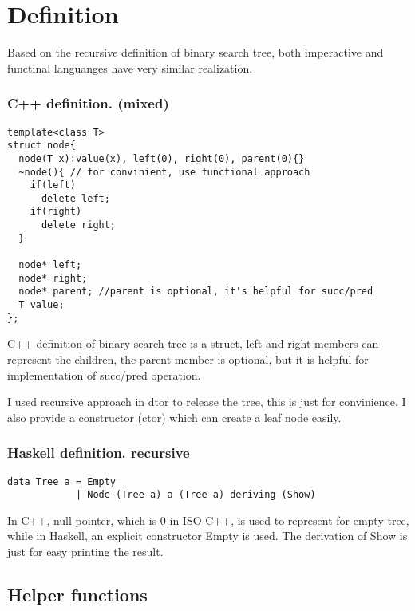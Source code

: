 \documentclass{article}
\begin{document}
\section{Definition}
\label{definition}

Based on the recursive definition of binary search tree, both imperactive and functinal 
languanges have very similar realization.

\subsubsection*{C++ definition. (mixed)}
\lstset{language=C++}
\begin{lstlisting}
template<class T>
struct node{
  node(T x):value(x), left(0), right(0), parent(0){}
  ~node(){ // for convinient, use functional approach
    if(left)
      delete left;
    if(right)
      delete right;
  }

  node* left; 
  node* right;
  node* parent; //parent is optional, it's helpful for succ/pred
  T value;
};
\end{lstlisting}

C++ definition of binary search tree is a struct, left
and right members can represent the children, the parent member is optional, but
it is helpful for implementation of succ/pred operation.

I used recursive approach in dtor to release the tree, this is just for 
convinience. I also provide a constructor (ctor) which can create a leaf
node easily.

\subsubsection*{Haskell definition. recursive}
\lstset{language=Haskell}
\begin{lstlisting}
data Tree a = Empty 
            | Node (Tree a) a (Tree a) deriving (Show)
\end{lstlisting}

In C++, null pointer, which is 0 in ISO C++, is used to represent for empty
tree, while in Haskell, an explicit constructor Empty is used. The derivation
of Show is just for easy printing the result.

\subsection{Helper functions} \label{helper-fun}
\end{document}
